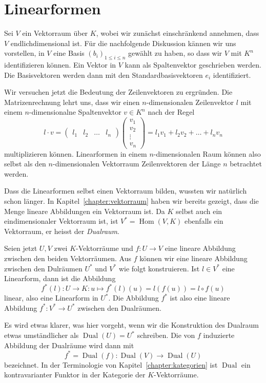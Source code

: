 %
%
%

\section{Linearformen}
Sei $V$ ein Vektorraum über $K$, wobei wir zunächst einschränkend
annehmen, dass $V$ endlichdimensional ist.
Für die nachfolgende Diskussion kännen wir uns vorstellen, in $V$ eine Basis
$(b_i)_{1\le i\le n}$ gewählt zu haben, so dass wir $V$ mit $K^n$
identifizieren können.
Ein Vektor in $V$ kann als Spaltenvektor geschrieben werden.
Die Basisvektoren werden dann mit den Standardbasisvektoren $e_i$
identifiziert.

Wir versuchen jetzt die Bedeutung der Zeilenvektoren zu ergründen.
Die Matrizenrechnung lehrt uns, dass wir einen $n$-dimensionalen
Zeilenvektor $l$ mit einem $n$-dimensionalne Spaltenvektor $v\in K^n$
nach der Regel
\[
l\cdot v
=
\begin{pmatrix}
l_1&l_2&\dots&l_n
\end{pmatrix}
\begin{pmatrix}v_1\\v_2\\\vdots\\v_n\end{pmatrix}
=
l_1v_1+l_2v_2+\dots+l_nv_n
\]
multiplizieren können.
Linearformen in einem $n$-dimensionalen Raum können also selbst
als den $n$-dimensionalen Vektorraum Zeilenvektoren der Länge $n$
betrachtet werden.

Dass die Linearformen selbst einen Vektorraum bilden, wussten wir
natürlich schon länger.
In Kapitel~\ref{chapter:vektorraum} haben wir bereits gezeigt,
dass die Menge lineare Abbildungen ein Vektorraum ist.
Da $K$ selbst auch ein eindimensionaler Vektorraum ist, ist
$V^*=\operatorname{Hom}(V,K)$ ebenfalls ein Vektorraum, er heisst
der {\em Dualraum}.
%

Seien jetzt $U,V$ zwei $K$-Vektorräume und $f\colon U\to V$ eine lineare
Abbildung zwischen den beiden Vektorräumen.
Aus $f$ können wir eine lineare Abbildung zwischen den Dulräumen
$U^*$ und $V^*$ wie folgt konstruieren.
Ist $l\in V^*$ eine Linearform, dann ist die Abbildung
\[
f^*(l)\colon U\to K:u\mapsto f^*(l)(u)=l(f(u)) = l\circ f(u)
\]
linear, also eine Linearform in $U^*$.
Die Abbildung $f^*$ ist also eine lineare Abbildung $f^*\colon V^*\to U^*$
zwischen den Dualräumen.

Es wird etwas klarer, was hier vorgeht, wenn wir die Konstruktion
des Dualraum etwas umständlicher als $\operatorname{Dual}(U)=U^*$
schreiben.
Die von $f$ induzierte Abbildung der Dualräume wird dann mit
\[
f^*
=
\operatorname{Dual}(f)
\colon 
\operatorname{Dual}(V)
\to
\operatorname{Dual}(U)
\]
bezeichnet.
In der Terminologie von Kapitel~\ref{chapter:kategorien} ist
$\operatorname{Dual}$ ein kontravarianter Funktor in der Kategorie
der $K$-Vektorräume.

